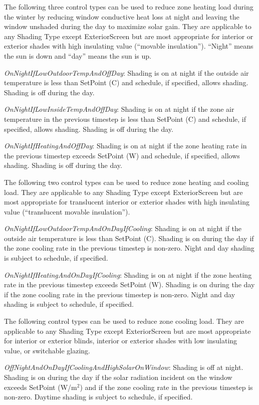 The following three control types can be used to reduce zone heating load during the winter by reducing window conductive heat loss at night and leaving the window unshaded during the day to maximize solar gain. They are applicable to any Shading Type except ExteriorScreen but are most appropriate for interior or exterior shades with high insulating value (``movable insulation''). ``Night'' means the sun is down and ``day'' means the sun is up.

\emph{OnNightIfLowOutdoorTempAndOffDay}: Shading is on at night if the outside air temperature is less than SetPoint (C) and schedule, if specified, allows shading. Shading is off during the day.

\emph{OnNightIfLowInsideTempAndOffDay}: Shading is on at night if the zone air temperature in the previous timestep is less than SetPoint (C) and schedule, if specified, allows shading. Shading is off during the day.

\emph{OnNightIfHeatingAndOffDay}: Shading is on at night if the zone heating rate in the previous timestep exceeds SetPoint (W) and schedule, if specified, allows shading. Shading is off during the day.

The following two control types can be used to reduce zone heating and cooling load. They are applicable to any Shading Type except ExteriorScreen but are most appropriate for translucent interior or exterior shades with high insulating value (``translucent movable insulation'').

\emph{OnNightIfLowOutdoorTempAndOnDayIfCooling}: Shading is on at night if the outside air temperature is less than SetPoint (C). Shading is on during the day if the zone cooling rate in the previous timestep is non-zero. Night and day shading is subject to schedule, if specified.

\emph{OnNightIfHeatingAndOnDayIfCooling}: Shading is on at night if the zone heating rate in the previous timestep exceeds SetPoint (W). Shading is on during the day if the zone cooling rate in the previous timestep is non-zero. Night and day shading is subject to schedule, if specified.

The following control types can be used to reduce zone cooling load. They are applicable to any Shading Type except ExteriorScreen but are most appropriate for interior or exterior blinds, interior or exterior shades with low insulating value, or switchable glazing.

\emph{OffNightAndOnDayIfCoolingAndHighSolarOnWindow}: Shading is off at night. Shading is on during the day if the solar radiation incident on the window exceeds SetPoint (W/m\(^{2}\)) and if the zone cooling rate in the previous timestep is non-zero. Daytime shading is subject to schedule, if specified.

